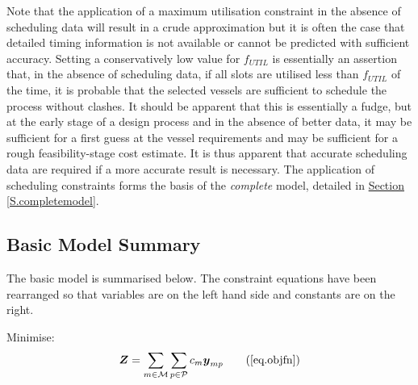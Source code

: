 Note that the application of a maximum utilisation constraint in the absence of
scheduling data will result in a crude approximation but it is often the case
that detailed timing information is not available or cannot be predicted with
sufficient accuracy.
Setting a conservatively low value for $f_{\mathit{UTIL}}$ is essentially an
assertion that, in the absence of scheduling data, if all slots are utilised
less than $f_{\mathit{UTIL}}$ of the time, it is probable that the selected
vessels are sufficient to schedule the process without clashes.
It should be apparent that this is essentially a fudge, but at the early stage
of a design process and in the absence of better data, it may be sufficient for
a first guess at the vessel requirements and may be sufficient for a rough
feasibility-stage cost estimate.
It is thus apparent that accurate scheduling data are required if a more
accurate result is necessary.  The application of scheduling constraints forms
the basis of the \emph{complete} model, detailed in
\hyperref[S.completemodel]{Section \ref*{S.completemodel}}.

\subsection{Basic Model Summary}\label{SS.basicsummary}

The basic model is summarised below.
The constraint equations have been rearranged so that variables are on the left
hand side and constants are on the right.

Minimise:
\begin{equation}
    \boldsymbol{Z} = \sum_{m \in \mathcal{M}} \sum_{p \in \mathcal{P}} c_m
    \boldsymbol{y}_{mp}
    \tag{\ref{eq.objfn}}
\end{equation}

